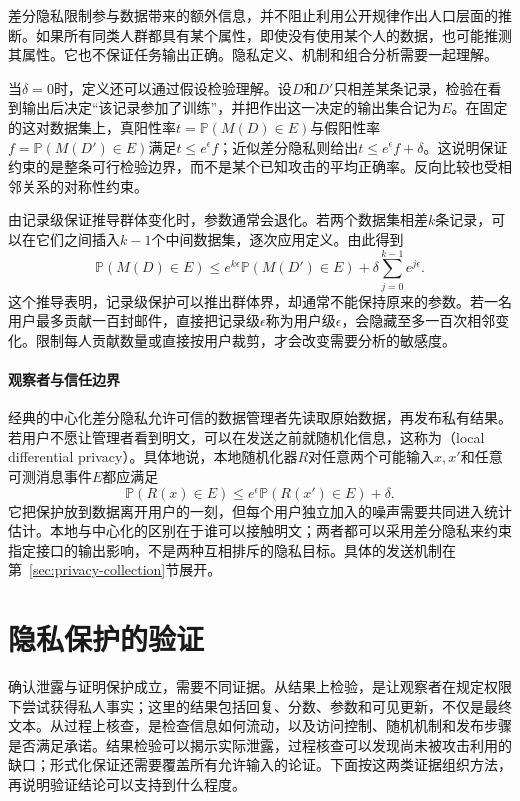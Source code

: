 差分隐私限制参与数据带来的额外信息，并不阻止利用公开规律作出人口层面的推断。如果所有同类人群都具有某个属性，即使没有使用某个人的数据，也可能推测其属性。它也不保证任务输出正确。隐私定义、机制和组合分析需要一起理解。

当$\delta=0$时，定义还可以通过假设检验理解。设$D$和$D'$只相差某条记录，检验在看到输出后决定“该记录参加了训练”，并把作出这一决定的输出集合记为$E$。在固定的这对数据集上，真阳性率$t=\mathbb P(M(D)\in E)$与假阳性率$f=\mathbb P(M(D')\in E)$满足$t\leq e^\epsilon f$；近似差分隐私则给出$t\leq e^\epsilon f+\delta$。这说明保证约束的是整条可行检验边界，而不是某个已知攻击的平均正确率。反向比较也受相邻关系的对称性约束。

由记录级保证推导群体变化时，参数通常会退化。若两个数据集相差$k$条记录，可以在它们之间插入$k-1$个中间数据集，逐次应用定义。由此得到
\begin{equation}
 \mathbb P(M(D)\in E)
 \leq e^{k\epsilon}\mathbb P(M(D')\in E)
   +\delta\sum_{j=0}^{k-1}e^{j\epsilon}.
 \label{eq:privacy-group-bound}
\end{equation}
这个推导表明，记录级保护可以推出群体界，却通常不能保持原来的参数。若一名用户最多贡献一百封邮件，直接把记录级$\epsilon$称为用户级$\epsilon$，会隐藏至多一百次相邻变化。限制每人贡献数量或直接按用户裁剪，才会改变需要分析的敏感度。

\paragraph{观察者与信任边界}

经典的中心化差分隐私允许可信的数据管理者先读取原始数据，再发布私有结果。若用户不愿让管理者看到明文，可以在发送之前就随机化信息，这称为（local differential privacy）。具体地说，本地随机化器$R$对任意两个可能输入$x,x'$和任意可测消息事件$E$都应满足
\[
 \mathbb P(R(x)\in E)
 \leq e^\epsilon\mathbb P(R(x')\in E)+\delta.
\]
它把保护放到数据离开用户的一刻，但每个用户独立加入的噪声需要共同进入统计估计。本地与中心化的区别在于谁可以接触明文；两者都可以采用差分隐私来约束指定接口的输出影响，不是两种互相排斥的隐私目标。具体的发送机制在第~\ref{sec:privacy-collection}节展开。

\section{隐私保护的验证}
\label{sec:privacy-verification}

确认泄露与证明保护成立，需要不同证据。从结果上检验，是让观察者在规定权限下尝试获得私人事实；这里的结果包括回复、分数、参数和可见更新，不仅是最终文本。从过程上核查，是检查信息如何流动，以及访问控制、随机机制和发布步骤是否满足承诺。结果检验可以揭示实际泄露，过程核查可以发现尚未被攻击利用的缺口；形式化保证还需要覆盖所有允许输入的论证。下面按这两类证据组织方法，再说明验证结论可以支持到什么程度。

